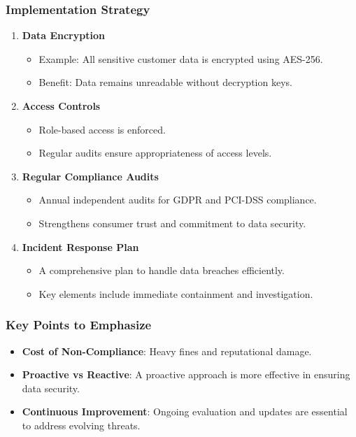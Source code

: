 \documentclass{beamer}
\begin{document}
\begin{frame}[fragile]
    \frametitle{Implementation Strategy}
    \begin{enumerate}
        \item \textbf{Data Encryption}
            \begin{itemize}
                \item Example: All sensitive customer data is encrypted using AES-256.
                \item Benefit: Data remains unreadable without decryption keys.
            \end{itemize}
        \item \textbf{Access Controls}
            \begin{itemize}
                \item Role-based access is enforced.
                \item Regular audits ensure appropriateness of access levels.
            \end{itemize}
        \item \textbf{Regular Compliance Audits}
            \begin{itemize}
                \item Annual independent audits for GDPR and PCI-DSS compliance.
                \item Strengthens consumer trust and commitment to data security.
            \end{itemize}
        \item \textbf{Incident Response Plan}
            \begin{itemize}
                \item A comprehensive plan to handle data breaches efficiently.
                \item Key elements include immediate containment and investigation.
            \end{itemize}
    \end{enumerate}
\end{frame}

\begin{frame}[fragile]
    \frametitle{Key Points to Emphasize}
    \begin{itemize}
        \item \textbf{Cost of Non-Compliance}: Heavy fines and reputational damage.
        \item \textbf{Proactive vs Reactive}: A proactive approach is more effective in ensuring data security.
        \item \textbf{Continuous Improvement}: Ongoing evaluation and updates are essential to address evolving threats.
    \end{itemize}
\end{frame}
\end{document}
